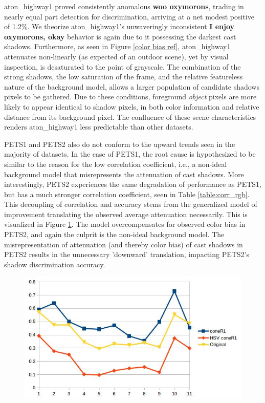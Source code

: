 \documentclass[12pt]{report}
\begin{document}
aton\_highway1 proved consistently anomalous \textbf{woo oxymorons}, trading in nearly equal part detection for discrimination, arriving at a net modest positive of 1.2\%. We theorize aton\_highway1's unwaveringly inconsistent \textbf{I enjoy oxymorons, okay} behavior is again due to it possessing the darkest cast shadows. Furthermore, as seen in Figure \ref{color bias ref}, aton\_highway1 attenuates non-linearly (as expected of an outdoor scene), yet by visual inspection, is desaturated to the point of grayscale. The combination of the strong shadows, the low saturation of the frame, and the relative featureless nature of the background model, allows a larger population of candidate shadows pixels to be gathered. Due to these conditions, foreground \textit{object} pixels are more likely to appear identical to shadow pixels, in both color information and relative distance from its background pixel. The confluence of these scene characteristics renders aton\_highway1 less predictable than other datasets.

PETS1 and PETS2 also do not conform to the upward trends seen in the majority of datasets. In the case of PETS1, the root cause is hypothesized to be similar to the reason for the low correlation coefficient, i.e., a non-ideal background model that misrepresents the attenuation of cast shadows. More interestingly, PETS2 experiences the same degradation of performance as PETS1, but has a much stronger correlation coefficient, seen in Table \ref{table:corr_rgb}. This decoupling of correlation and accuracy stems from the generalized model of improvement translating the observed average attenuation necessarily. This is visualized in Figure \ref{fig:pets2_translate}. The model overcompensates for observed color bias in PETS2, and again the culprit is the non-ideal background model. The misrepresentation of attenuation (and thereby color bias) of cast shadows in PETS2 results in the unnecessary 'downward' translation, impacting PETS2's shadow discrimination accuracy.

\begin{figure}
  \centering
  \includegraphics[width=1\linewidth]{figures/model/pets2_translate.jpg}
\caption{}
\label{fig:pets2_translate}
\end{figure} 
\end{document}
